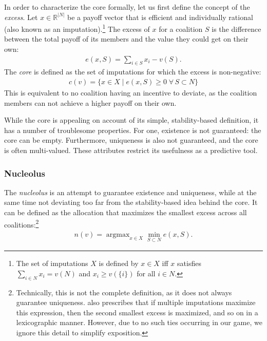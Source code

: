 \documentclass[12pt]{article}
\DeclareMathOperator*{\argmax}{argmax}
\begin{document}
In order to characterize the core formally, let us first define the concept of the \emph{excess}. Let $x \in \mathbb{R}^{|N|}$ be a payoff vector that is efficient and individually rational (also known as an imputation).\footnote{The set of imputations $X$ is defined by $x \in X$ iff $x$ satisfies $\sum_{i \in N} x_i = v(N)$ and $x_i \geq v(\{i\})$ for all $i \in N$.} The excess of $x$ for a coalition $S$ is the difference between the total payoff of its members and the value they could get on their own:
\begin{align*}
    e(x, S) = \sum_{i \in S} x_i - v(S).
\end{align*}
The \emph{core} is defined as the set of imputations for which the excess is non-negative:
\begin{align*}
    c(v) = \{x \in X \mid e(x, S) \geq 0 \;\forall\, S \subset N\}
\end{align*}
This is equivalent to no coalition having an incentive to deviate, as the coalition members can not achieve a higher payoff on their own.

While the core is appealing on account of its simple, stability-based definition, it has a number of troublesome properties. For one, existence is not guaranteed: the core can be empty. Furthermore, uniqueness is also not guaranteed, and the core is often multi-valued. These attributes restrict its usefulness as a predictive tool.

\subsubsection{Nucleolus}

The \emph{nucleolus} \parencite{schmeidler1969nucleolus} is an attempt to guarantee existence and uniqueness, while at the same time not deviating too far from the stability-based idea behind the core. It can be defined as the allocation that maximizes the smallest excess across all coalitions:\footnote{Technically, this is not the complete definition, as it does not always guarantee uniqueness. \textcite{schmeidler1969nucleolus} also prescribes that if multiple imputations maximize this expression, then the second smallest excess is maximized, and so on in a lexicographic manner. However, due to no such ties occurring in our game, we ignore this detail to simplify exposition.}
\begin{align*}
    n(v) = \argmax_{x \in X} \min_{S \subset N} e(x, S).
\end{align*}
\end{document}
